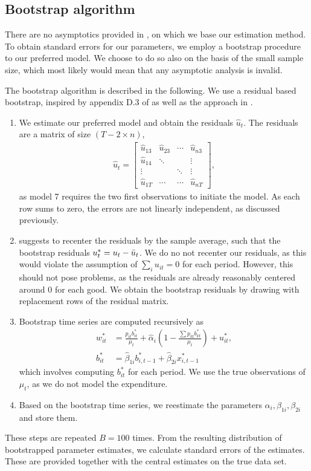 \subsection{Bootstrap algorithm}
There are no asymptotics provided in \cite{pollak1992demand}, on which we base our estimation method. 
To obtain standard errors for our parameters, we employ a bootstrap procedure to our preferred model. We choose to do so also on the basis of the small sample size, which most likely would mean that any asymptotic analysis is invalid.

The bootstrap algorithm is described in the following. We use a residual based bootstrap, inspired by appendix D.3 of \cite{lutkepohl2005new} as well as the approach in \cite{CRANFIELD2002289}.

\begin{enumerate}
    \item We estimate our preferred model and obtain the residuals $\hat{u}_{t}$. The residuals are a matrix of size $(T-2 \times n)$,
    \begin{align}
       \hat{u}_t= \begin{bmatrix}
\hat{u}_{13}  & \hat{u}_{23}    & \cdots    &   \hat{u}_{n3}      \\
\hat{u}_{14}   & \ddots &  & \vdots  \\
\vdots &  & \ddots & \vdots  \\
\hat{u}_{1T}  & \cdots & \cdots & \hat{u}_{nT}  
\end{bmatrix},
    \end{align}
    as model 7 requires the two first observations to initiate the model. As each row sums to zero, the errors are not linearly independent, as discussed previously.
    \item \cite{lutkepohl2005new} suggests to recenter the residuals by the sample average, such that the bootstrap residuals $u^{*}_{t}=u_t - \Bar{u}_t$. We do no not recenter our residuals, as this would violate the assumption of $\sum_i u_{it}=0$ for each period. However, this should not pose problems, as the residuals are already reasonably centered around 0 for each good. We obtain the bootstrap residuals by drawing with replacement rows of the residual matrix.
    \item Bootstrap time series are computed recursively as 
    \begin{align}
        w^{*}_{it} &=  \frac{p_{it} b^{*}_{it}}{\mu_t} + \hat{\alpha}_i \left( 1-\frac{\sum p_{kt}b^{*}_{kt}}{\mu_t}\right)+ u^{*}_{it}, \\
        b^{*}_{it} &= \hat{\beta}_{1i} b^{*}_{i,t-1}  + \hat{\beta}_{2i} x^{*}_{i,t-1}
    \end{align}
    which involves computing $b^{*}_{it}$ for each period. We use the true observations of $\mu_t$, as we do not model the expenditure.
    \item Based on the bootstrap time series, we reestimate the parameters $\alpha_i, \beta_{1i}, \beta_{2i}$ and store them.
\end{enumerate}
These steps are repeated $B=100$ times. From the resulting distribution of bootstrapped parameter estimates, we calculate standard errors of the estimates. These are provided together with the central estimates on the true data set.
